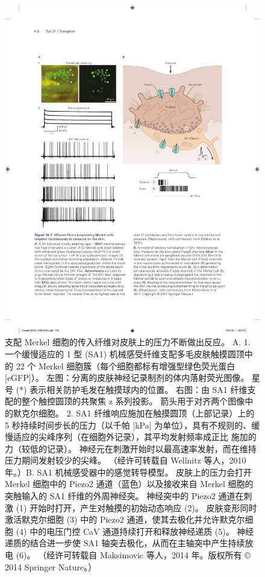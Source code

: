 \begin{figure}[htbp]
	\centering
	\includegraphics[width=1.0\linewidth]{chap18/fig_18_7}
	\caption{支配 Merkel 细胞的传入纤维对皮肤上的压力不断做出反应。
		A. 1. 一个缓慢适应的 1 型 (SA1) 机械感受纤维支配多毛皮肤触摸圆顶中的 22 个 Merkel 细胞簇（每个细胞都标有增强型绿色荧光蛋白 [eGFP]）。
		左图：分离的皮肤神经记录制剂的体内落射荧光图像。
		星号 (*) 表示相关防护毛发在触摸球内的位置。
		右图：由 SA1 纤维支配的整个触控圆顶的共聚焦 z 系列投影。
		箭头用于对齐两个图像中的默克尔细胞。
		2. SA1 纤维响应施加在触摸圆顶（上部记录）上的 5 秒持续时间步长的压力（以千帕 [kPa] 为单位），具有不规则的、缓慢适应的尖峰序列（在细胞外记录），其平均发射频率成正比 施加的力（较低的记录）。
		神经元在刺激开始时以最高速率发射，而在维持压力期间发射较少的尖峰。 （经许可转载自 Wellnitz 等人，2010 年。）B. SA1 机械感受器中的感觉转导模型。
		皮肤上的压力会打开 Merkel 细胞中的 Piezo2 通道（蓝色）以及接收来自 Merkel 细胞的突触输入的 SA1 纤维的外周神经突。
		神经突中的 Piezo2 通道在刺激 (1) 开始时打开，产生对触摸的初始动态响应 (2)。
		皮肤变形同时激活默克尔细胞 (3) 中的 Piezo2 通道，使其去极化并允许默克尔细胞 (4) 中的电压门控 CaV 通道持续打开和释放神经递质 (5)。
		神经递质的结合进一步使 SA1 轴突去极化，从而在主轴突中产生持续放电 (6)。 （经许可转载自 Maksimovic 等人，2014 年。版权所有 © 2014 Springer Nature。）}
	\label{fig:18_7}
\end{figure}


